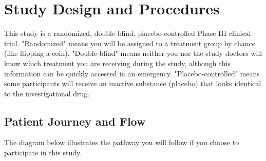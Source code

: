 \section{Study Design and Procedures}
This study is a randomized, double-blind, placebo-controlled Phase III clinical trial. "Randomized" means you will be assigned to a treatment group by chance (like flipping a coin). "Double-blind" means neither you nor the study doctors will know which treatment you are receiving during the study, although this information can be quickly accessed in an emergency. "Placebo-controlled" means some participants will receive an inactive substance (placebo) that looks identical to the investigational drug.

\subsection{Patient Journey and Flow}
The diagram below illustrates the pathway you will follow if you choose to participate in this study.

